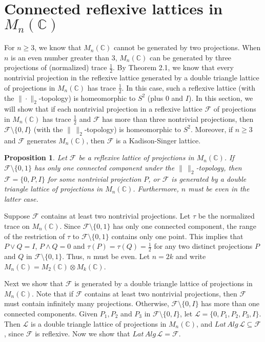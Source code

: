 \documentclass[12pt]{article}
\newtheorem{prop}{Proposition}[section]
\newcommand{\LLL}{\mathcal L} %
\newcommand{\FFF}{\mathcal F}
\newcommand{\C}{\mathbb C} %
\def\L{{\mathcal{L}}}
\begin{document}
{\section{Connected reflexive lattices in $M_n(\C)$}

For $n\geq 3$, we know that $M_n(\C)$ cannot be generated by two
projections. When $n$ is an even number greater than $3$, $M_n(\C)$
can be generated by three projections of (normalized) trace
$\frac12$. By Theorem 2.1, we know that every nontrivial projection
in the reflexive lattice generated by a double triangle lattice of
projections in $M_n(\C)$ has trace $\frac12$. In this case, such a
reflexive lattice (with the $\|\cdot\|_2$-topology) is homeomorphic
to $S^2$ (plus $0$ and $I$). In this section, we will show that if
each nontrivial projection in a reflexive lattice $\mathcal{F}$ of
projections in $M_n(\C)$ has trace $\frac12$ and $\FFF$ has more
than three nontrivial projections, then
$\mathcal{F}\setminus\{0,I\}$ (with the $\|\,\|_2$-topology) is
homeomorphic to $S^2$. Moreover, if $n \geq 3$ and $\FFF$ generates
$M_n(\C)$, then $\mathcal{F}$ is a Kadison-Singer lattice.

\begin{prop}
 Let $\FFF$ be a reflexive lattice of projections
in $M_n(\C)$. If $\FFF \setminus \{0, 1 \}$ has only one connected
component under the $\|\,\|_2$-topology, then $\FFF=\{0,P,I\}$ for
some nontrivial projection $P$, or $\FFF$ is generated by a double
triangle lattice of projections in $M_n(\C)$. Furthermore, $n$ must
be even in the latter case.
\end{prop}

\quad  Suppose $\FFF$ contains at least two
nontrivial projections. Let $\tau$ be the normalized trace on
$M_{n}(\C)$. Since  $\FFF \setminus \{0, 1 \}$ has only one
connected component, the range of the restriction of $\tau$ to $\FFF
\setminus \{0, 1 \}$ contains only one point. This implies that
$P\vee Q=I$, $P\wedge Q=0$ and $\tau(P)=\tau(Q)=\frac12$ for any two
distinct projections $P$ and $Q$ in $\FFF \setminus \{0, 1 \}$.
Thus, $n$ must be even. Let $n=2k$ and write $M_n(\C)=M_2(\C)\otimes
M_k(\C)$.

Next we show that $\FFF$ is generated by a double triangle lattice
of projections in $M_n(\C)$. Note that if $\FFF$ contains at least
two nontrivial projections, then $\FFF$ must contain infinitely many
projections. Otherwise, $\FFF \setminus \{0,I\}$ has more than one
connected components. Given $P_1,P_2$ and $P_3$ in
$\FFF\setminus\{0,I\}$, let $\L=\{0,P_1,P_2,P_3,I\}$. Then $\LLL$ is
a double triangle lattice of projections in $M_n(\C)$, and
$Lat\,Alg\,\LLL\subseteq\FFF$, since $\FFF$ is reflexive. Now we
show that $Lat\,Alg\,\LLL=\FFF$.

}
\end{document}
